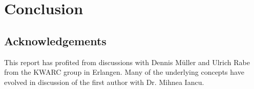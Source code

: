 \section{Conclusion}\label{sec:concl}

\subsection*{Acknowledgements}
This report has profited from discussions with Dennis M\"uller and Ulrich Rabe from the
KWARC group in Erlangen. Many of the underlying concepts have evolved in discussion of
the first author with Dr. Mihnea Iancu.



